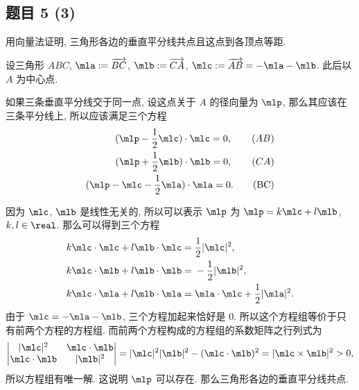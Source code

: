 \subsection*{ 题目 5 (3) }
\begin{problem*}
用向量法证明, 三角形各边的垂直平分线共点且这点到各顶点等距.
\end{problem*}
\begin{solution}
设三角形 $ABC$, $\mla := \lvec{BC}$, $\mlb := \lvec{CA}$, $\mlc := \lvec{AB} = -\mla- \mlb$. 此后以 $A$ 为中心点. 

如果三条垂直平分线交于同一点, 设这点关于 $A$ 的径向量为 $\mlp$, 那么其应该在三条平分线上, 所以应该满足三个方程
\begin{align*}
    (\mlp - \frac{1}{2}\mlc) \cdot \mlc = 0, \tag{$AB$}\\
    (\mlp + \frac{1}{2}\mlb) \cdot \mlb = 0, \tag{$CA$}\\
    (\mlp - \mlc - \frac{1}{2}\mla) \cdot \mla = 0. \tag{BC}\\
\end{align*}

因为 $\mlc$, $\mlb$ 是线性无关的, 所以可以表示 $\mlp$ 为 $\mlp = k \mlc + l \mlb$, $k, l \in \real$. 那么可以得到三个方程
\[
    \begin{aligned}
        k \mlc \cdot \mlc + l \mlb \cdot \mlc ={}& \frac{1}{2}|\mlc|^2, \\
        k \mlc \cdot \mlb + l \mlb \cdot \mlb ={}& -\frac{1}{2}|\mlb|^2, \\
        k \mlc \cdot \mla + l \mlb \cdot \mla ={}& \mla \cdot \mlc + \frac{1}{2}|\mla|^2.
    \end{aligned}
\]
由于 $\mlc = -\mla - \mlb$, 三个方程加起来恰好是 $0$. 所以这个方程组等价于只有前两个方程的方程组. 而前两个方程构成的方程组的系数矩阵之行列式为
\[
\left|
\begin{matrix}
    |\mlc|^2 & \mlc \cdot \mlb \\
    \mlc \cdot \mlb & |\mlb|^2
\end{matrix}
\right| =
|\mlc|^2|\mlb|^2 - (\mlc \cdot \mlb)^2 = |\mlc \times \mlb|^2 > 0,
\]
所以方程组有唯一解. 这说明 $\mlp$ 可以存在. 那么三角形各边的垂直平分线共点.


\end{solution}

